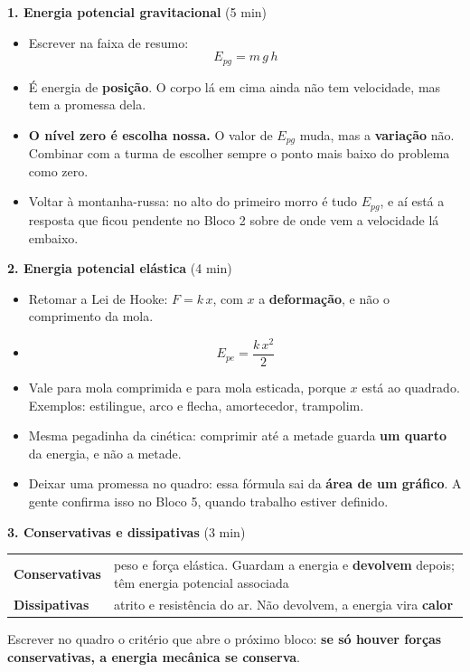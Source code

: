 \documentclass[11pt,a4paper]{article}
\begin{document}
\begin{quadro}
\textbf{1. Energia potencial gravitacional} (5 min)
\begin{itemize}[nosep]
  \item Escrever na faixa de resumo:
  \[
    \boxed{E_{pg} = m\,g\,h}
  \]
  \item \'E energia de \textbf{posi\c{c}\~ao}. O corpo l\'a em cima
        ainda n\~ao tem velocidade, mas tem a promessa dela.
  \item \textbf{O n\'ivel zero \'e escolha nossa.} O valor de $E_{pg}$
        muda, mas a \textbf{varia\c{c}\~ao} n\~ao. Combinar com a turma
        de escolher sempre o ponto mais baixo do problema como zero.
  \item Voltar \`a montanha-russa: no alto do primeiro morro \'e tudo
        $E_{pg}$, e a\'i est\'a a resposta que ficou pendente no Bloco
        2 sobre de onde vem a velocidade l\'a embaixo.
\end{itemize}

\medskip
\textbf{2. Energia potencial el\'astica} (4 min)
\begin{itemize}[nosep]
  \item Retomar a Lei de Hooke: $F = k\,x$, com
        $x$ a \textbf{deforma\c{c}\~ao}, e n\~ao o comprimento da mola.
  \item
  \[
    \boxed{E_{pe} = \frac{k\,x^2}{2}}
  \]
  \item Vale para mola comprimida e para mola esticada, porque $x$
        est\'a ao quadrado. Exemplos: estilingue, arco e flecha,
        amortecedor, trampolim.
  \item Mesma pegadinha da cin\'etica: comprimir at\'e a metade guarda
        \textbf{um quarto} da energia, e n\~ao a metade.
  \item Deixar uma promessa no quadro: essa f\'ormula sai da
        \textbf{\'area de um gr\'afico}. A gente confirma isso no Bloco
        5, quando trabalho estiver definido.
\end{itemize}

\medskip
\textbf{3. Conservativas e dissipativas} (3 min)
\begin{center}\small
  \begin{tabular}{@{}p{4.2cm}p{7.2cm}@{}}
    \toprule
    \textbf{Conservativas} & peso e for\c{c}a el\'astica. Guardam a
      energia e \textbf{devolvem} depois; t\^em energia potencial
      associada \\
    \textbf{Dissipativas} & atrito e resist\^encia do ar. N\~ao
      devolvem, a energia vira \textbf{calor} \\
    \bottomrule
  \end{tabular}
\end{center}
Escrever no quadro o crit\'erio que abre o pr\'oximo bloco: \textbf{se
s\'o houver for\c{c}as conservativas, a energia mec\^anica se
conserva}.
\end{quadro}
\end{document}
